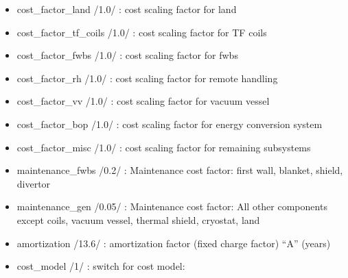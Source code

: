 \documentclass[]{article}
\begin{document}
\begin{itemize}
\item
  cost\_factor\_land /1.0/ : cost scaling factor for land
\item
  cost\_factor\_tf\_coils /1.0/ : cost scaling factor for TF coils
\item
  cost\_factor\_fwbs /1.0/ : cost scaling factor for fwbs
\item
  cost\_factor\_rh /1.0/ : cost scaling factor for remote handling
\item
  cost\_factor\_vv /1.0/ : cost scaling factor for vacuum vessel
\item
  cost\_factor\_bop /1.0/ : cost scaling factor for energy conversion
  system
\item
  cost\_factor\_misc /1.0/ : cost scaling factor for remaining
  subsystems
\item
  maintenance\_fwbs /0.2/ : Maintenance cost factor: first wall,
  blanket, shield, divertor
\item
  maintenance\_gen /0.05/ : Maintenance cost factor: All other
  components except coils, vacuum vessel, thermal shield, cryostat, land
\item
  amortization /13.6/ : amortization factor (fixed charge factor) ``A''
  (years)
\item
  cost\_model /1/ : switch for cost model:


\end{itemize}
\end{document}
